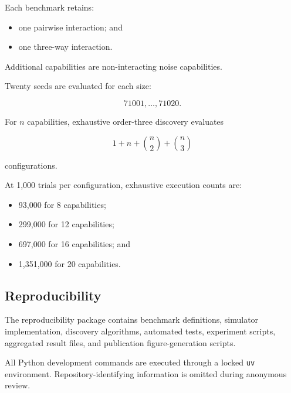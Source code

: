 Each benchmark retains:

\begin{itemize}
\tightlist
\item
  one pairwise interaction; and
\item
  one three-way interaction.
\end{itemize}

Additional capabilities are non-interacting noise capabilities.

Twenty seeds are evaluated for each size:

\[
71001,\ldots,71020.
\]

For \(n\) capabilities, exhaustive order-three discovery evaluates

\[
1+n+\binom{n}{2}+\binom{n}{3}
\]

configurations.

At 1,000 trials per configuration, exhaustive execution counts are:

\begin{itemize}
\tightlist
\item
  93,000 for 8 capabilities;
\item
  299,000 for 12 capabilities;
\item
  697,000 for 16 capabilities; and
\item
  1,351,000 for 20 capabilities.
\end{itemize}

\subsection{Reproducibility}

The reproducibility package contains benchmark definitions, simulator implementation, discovery algorithms, automated tests, experiment scripts, aggregated result files, and publication figure-generation scripts.

All Python development commands are executed through a locked \texttt{uv} environment. Repository-identifying information is omitted during anonymous review.
